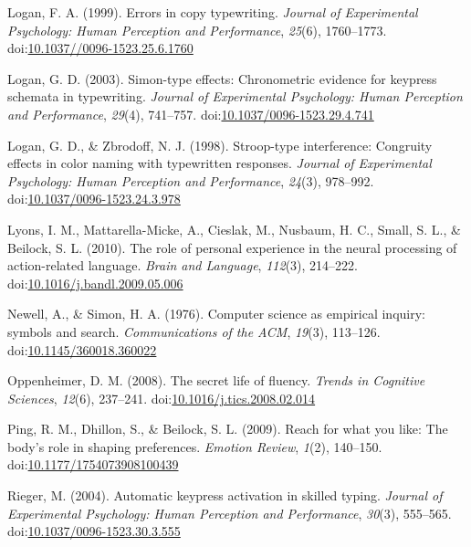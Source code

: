 \documentclass[english,man]{apa6}
\theoremstyle{definition}
\theoremstyle{definition}
\theoremstyle{definition}
\theoremstyle{remark}
\begin{document}
\hypertarget{ref-Logan1999}{}
Logan, F. A. (1999). Errors in copy typewriting. \emph{Journal of
Experimental Psychology: Human Perception and Performance},
\emph{25}(6), 1760--1773.
doi:\href{https://doi.org/10.1037//0096-1523.25.6.1760}{10.1037//0096-1523.25.6.1760}

\hypertarget{ref-Logan2003}{}
Logan, G. D. (2003). Simon-type effects: Chronometric evidence for
keypress schemata in typewriting. \emph{Journal of Experimental
Psychology: Human Perception and Performance}, \emph{29}(4), 741--757.
doi:\href{https://doi.org/10.1037/0096-1523.29.4.741}{10.1037/0096-1523.29.4.741}

\hypertarget{ref-Logan1998}{}
Logan, G. D., \& Zbrodoff, N. J. (1998). Stroop-type interference:
Congruity effects in color naming with typewritten responses.
\emph{Journal of Experimental Psychology: Human Perception and
Performance}, \emph{24}(3), 978--992.
doi:\href{https://doi.org/10.1037/0096-1523.24.3.978}{10.1037/0096-1523.24.3.978}

\hypertarget{ref-Lyons2010}{}
Lyons, I. M., Mattarella-Micke, A., Cieslak, M., Nusbaum, H. C., Small,
S. L., \& Beilock, S. L. (2010). The role of personal experience in the
neural processing of action-related language. \emph{Brain and Language},
\emph{112}(3), 214--222.
doi:\href{https://doi.org/10.1016/j.bandl.2009.05.006}{10.1016/j.bandl.2009.05.006}

\hypertarget{ref-Newell1976}{}
Newell, A., \& Simon, H. A. (1976). Computer science as empirical
inquiry: symbols and search. \emph{Communications of the ACM},
\emph{19}(3), 113--126.
doi:\href{https://doi.org/10.1145/360018.360022}{10.1145/360018.360022}

\hypertarget{ref-Oppenheimer2008}{}
Oppenheimer, D. M. (2008). The secret life of fluency. \emph{Trends in
Cognitive Sciences}, \emph{12}(6), 237--241.
doi:\href{https://doi.org/10.1016/j.tics.2008.02.014}{10.1016/j.tics.2008.02.014}

\hypertarget{ref-Ping2009}{}
Ping, R. M., Dhillon, S., \& Beilock, S. L. (2009). Reach for what you
like: The body's role in shaping preferences. \emph{Emotion Review},
\emph{1}(2), 140--150.
doi:\href{https://doi.org/10.1177/1754073908100439}{10.1177/1754073908100439}

\hypertarget{ref-Rieger2004}{}
Rieger, M. (2004). Automatic keypress activation in skilled typing.
\emph{Journal of Experimental Psychology: Human Perception and
Performance}, \emph{30}(3), 555--565.
doi:\href{https://doi.org/10.1037/0096-1523.30.3.555}{10.1037/0096-1523.30.3.555}
\end{document}
